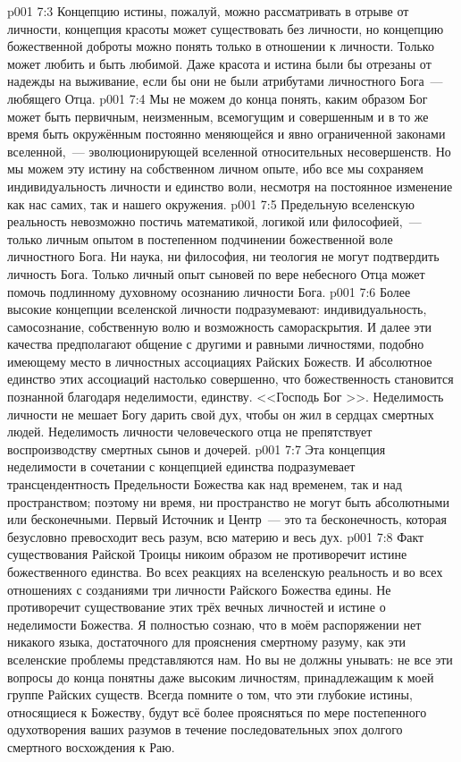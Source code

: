 \vs p001 7:3 \pc Концепцию истины, пожалуй, можно рассматривать в отрыве от личности, концепция красоты может существовать без личности, но концепцию божественной доброты можно понять только в отношении к личности. Только  может любить и быть любимой. Даже красота и истина были бы отрезаны от надежды на выживание, если бы они не были атрибутами личностного Бога~--- любящего Отца.
\vs p001 7:4 \pc Мы не можем до конца понять, каким образом Бог может быть первичным, неизменным, всемогущим и совершенным и в то же время быть окружённым постоянно меняющейся и явно ограниченной законами вселенной,~--- эволюционирующей вселенной относительных несовершенств. Но мы можем  эту истину на собственном личном опыте, ибо все мы сохраняем индивидуальность личности и единство воли, несмотря на постоянное изменение как нас самих, так и нашего окружения.
\vs p001 7:5 Предельную вселенскую реальность невозможно постичь математикой, логикой или философией,~--- только личным опытом в постепенном подчинении божественной воле личностного Бога. Ни наука, ни философия, ни теология не могут подтвердить личность Бога. Только личный опыт сыновей по вере небесного Отца может помочь подлинному духовному осознанию личности Бога.
\vs p001 7:6 \pc Более высокие концепции вселенской личности подразумевают: индивидуальность, самосознание, собственную волю и возможность самораскрытия. И далее эти качества предполагают общение с другими и равными личностями, подобно имеющему место в личностных ассоциациях Райских Божеств. И абсолютное единство этих ассоциаций настолько совершенно, что божественность становится познанной благодаря неделимости, единству. <<Господь Бог >>. Неделимость личности не мешает Богу дарить свой дух, чтобы он жил в сердцах смертных людей. Неделимость личности человеческого отца не препятствует воспроизводству смертных сынов и дочерей.
\vs p001 7:7 Эта концепция неделимости в сочетании с концепцией единства подразумевает трансцендентность Предельности Божества как над временем, так и над пространством; поэтому ни время, ни пространство не могут быть абсолютными или бесконечными. Первый Источник и Центр~--- это та бесконечность, которая безусловно превосходит весь разум, всю материю и весь дух.
\vs p001 7:8 Факт существования Райской Троицы никоим образом не противоречит истине божественного единства. Во всех реакциях на вселенскую реальность и во всех отношениях с созданиями три личности Райского Божества едины. Не противоречит существование этих трёх вечных личностей и истине о неделимости Божества. Я полностью сознаю, что в моём распоряжении нет никакого языка, достаточного для прояснения смертному разуму, как эти вселенские проблемы представляются нам. Но вы не должны унывать: не все эти вопросы до конца понятны даже высоким личностям, принадлежащим к моей группе Райских существ. Всегда помните о том, что эти глубокие истины, относящиеся к Божеству, будут всё более проясняться по мере постепенного одухотворения ваших разумов в течение последовательных эпох долгого смертного восхождения к Раю.
